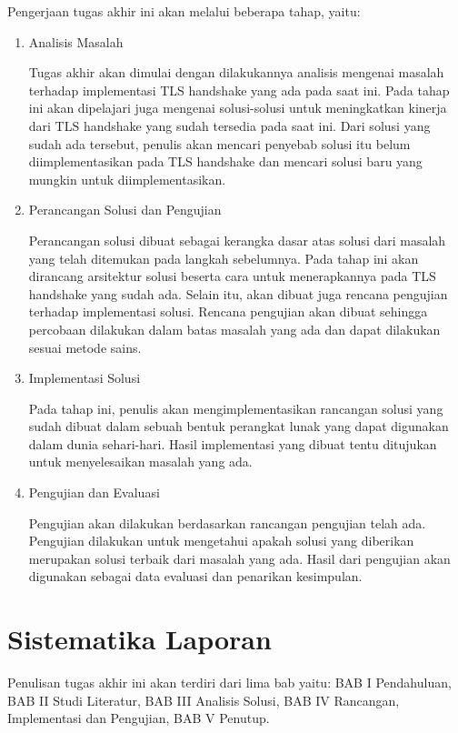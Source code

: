 Pengerjaan tugas akhir ini akan melalui beberapa tahap, yaitu:
\begin{enumerate}
  \item Analisis Masalah

  Tugas akhir akan dimulai dengan dilakukannya analisis mengenai masalah terhadap implementasi TLS handshake yang ada pada saat ini. Pada tahap ini akan dipelajari juga mengenai solusi-solusi untuk meningkatkan kinerja dari TLS handshake yang sudah tersedia pada saat ini. Dari solusi yang sudah ada tersebut, penulis akan mencari penyebab solusi itu belum diimplementasikan pada TLS handshake dan mencari solusi baru yang mungkin untuk diimplementasikan.

  \item Perancangan Solusi dan Pengujian

  Perancangan solusi dibuat sebagai kerangka dasar atas solusi dari masalah yang telah ditemukan pada langkah sebelumnya. Pada tahap ini akan dirancang arsitektur solusi beserta cara untuk menerapkannya pada TLS handshake yang sudah ada. Selain itu, akan dibuat juga rencana pengujian terhadap implementasi solusi. Rencana pengujian akan dibuat sehingga percobaan dilakukan dalam batas masalah yang ada dan dapat dilakukan sesuai metode sains.

  \item Implementasi Solusi

  Pada tahap ini, penulis akan mengimplementasikan rancangan solusi yang sudah dibuat dalam sebuah bentuk perangkat lunak yang dapat digunakan dalam dunia sehari-hari. Hasil implementasi yang dibuat tentu ditujukan untuk menyelesaikan masalah yang ada.

  \item Pengujian dan Evaluasi

  Pengujian akan dilakukan berdasarkan rancangan pengujian telah ada. Pengujian dilakukan untuk mengetahui apakah solusi yang diberikan merupakan solusi terbaik dari masalah yang ada. Hasil dari pengujian akan digunakan sebagai data evaluasi dan penarikan kesimpulan.

\end{enumerate}


\section{Sistematika Laporan}

Penulisan tugas akhir ini akan terdiri dari lima bab yaitu: BAB I Pendahuluan, BAB II Studi Literatur, BAB III Analisis Solusi, BAB IV Rancangan, Implementasi dan Pengujian, BAB V Penutup.

